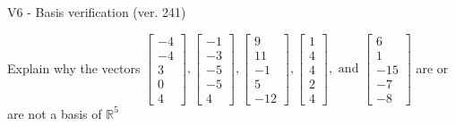 \begin{exercise}
  \begin{exerciseTitle}V6 - Basis verification (ver. 241)\end{exerciseTitle}
  \begin{exerciseStatement}
    Explain why the vectors \(\left[\begin{array}{r}
-4 \\
-4 \\
3 \\
0 \\
4
\end{array}\right] , \left[\begin{array}{r}
-1 \\
-3 \\
-5 \\
-5 \\
4
\end{array}\right] , \left[\begin{array}{r}
9 \\
11 \\
-1 \\
5 \\
-12
\end{array}\right] , \left[\begin{array}{r}
1 \\
4 \\
4 \\
2 \\
4
\end{array}\right] , \text{ and } \left[\begin{array}{r}
6 \\
1 \\
-15 \\
-7 \\
-8
\end{array}\right]\) are or are not a basis of \(\mathbb{R}^5\)	



\end{exerciseStatement}
\end{exercise}
